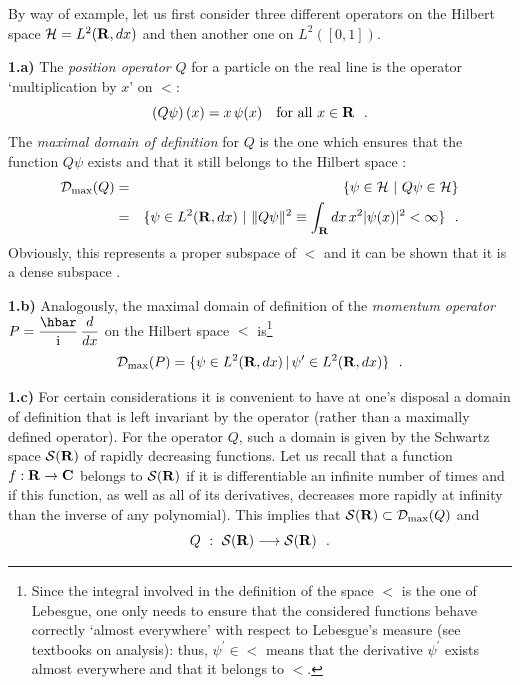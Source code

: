 \documentclass[12pt]{report}
\begin{document}
By way of example, let us first consider 
three different operators on the Hilbert space ${\cal H} ={L^2 ({{\bf R}},dx)}$ 
and then another one on $L^2([0,1])$. 

\medskip 
\noindent
{\bf 1.a)}
The {\em position operator} $Q$ for a particle 
on the real line 
is the operator 
`multiplication by $x$'
on $\lt$:
\begin{equation}
\label{pos}
\left(Q \psi \right) (x) = x \, \psi (x)
\quad  \mbox{for all $x\in {\bf R}$}
\ \ .
\end{equation}
The {\em maximal domain of definition} for $Q$ is 
the one which ensures that the function 
$Q\psi$ exists and that it still belongs to the Hilbert
space : 
\begin{eqnarray}
{\cal D}_{\rm max} (Q) 
&=& \{ \psi \in {\cal H} \ | \ Q\psi \in {\cal H} \}
\nonumber 
\\
\label{dq}
&=& \{ \psi \in {L^2 ({{\bf R}},dx)} \ | \
\| Q \psi \|^2 \equiv \int_{{\bf R}}dx \, x^2 | \psi (x) |^2
< \infty \}
\ \ .
\end{eqnarray}
Obviously, this represents a proper subspace of $\lt$ and it can 
be shown that it is a dense subspace \cite{sg,rs}.  

\medskip 
\noindent
{\bf 1.b)}
Analogously, 
the maximal domain of definition of the {\em momentum operator} 
$P= \ds{\hbar \over \ri} \, \ds{d \over dx}$ 
on the Hilbert space $\lt$
is\footnote{Since the integral involved in the definition of the space 
$\lt$ is the one of 
Lebesgue, one only needs to ensure that the considered functions 
behave correctly `almost everywhere' with respect to Lebesgue's
measure (see textbooks on analysis): 
thus, $\psi^{\prime} \in \lt$ means that the derivative 
$\psi^{\prime}$ exists almost everywhere and that it belongs to 
$\lt$.}
\[
{\cal D}_{\rm max} (P) = \{ \psi \in {L^2 ({{\bf R}},dx)} \, | \,
\psi^{\prime} \in {L^2 ({{\bf R}},dx)} \}
\ \ .
\]

\medskip 
\noindent
{\bf 1.c)}
For certain considerations it is convenient to 
have at one's disposal 
a domain of definition that is left invariant by the operator
(rather than a maximally defined operator).   
For the operator $Q$, such a domain is given by the Schwartz space 
${\cal S}({\bf R})$ of rapidly decreasing functions. 
Let us recall that a function $f : {\bf R} \to {\bf C}$ belongs to ${\cal S}({\bf R})$
if it is differentiable an infinite number of times and if this function,  
as well as all of its derivatives, 
decreases more rapidly at infinity than  
the inverse of any polynomial). This implies that 
${\cal S}({\bf R}) \subset {\cal D}_{\rm max} (Q)$ and 
\begin{equation}
\label{qsc}
Q \ : \ {\cal S}({\bf R}) \longrightarrow {\cal S}({\bf R})
\ \ .
\end{equation}
\end{document}
